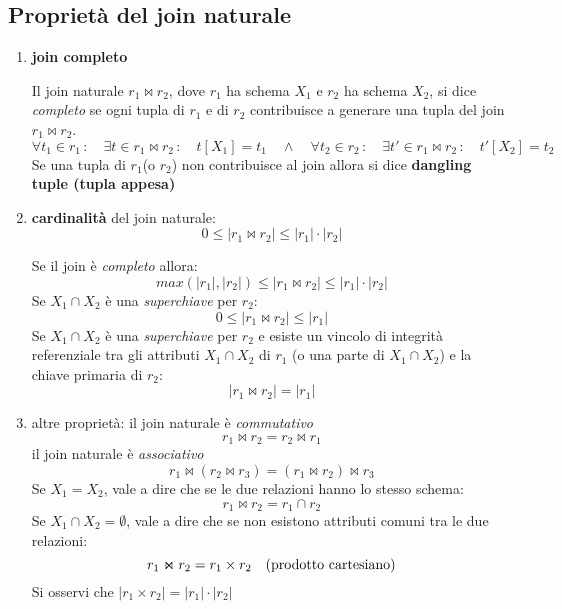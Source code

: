 \documentclass[a4paper, 10pt]{article}
\theoremstyle{definition}
\begin{document}
	\newpage
		
		\subsection*{Proprietà del join naturale}
			\begin{enumerate}
				\item \textbf{join completo}
				
						Il join naturale $r_1 \Join r_2$, dove $r_1$ ha schema $ X_1 $ e $ r_2 $ ha schema 
						$ X_2 $, si dice \emph{completo} se ogni tupla di $ r_1 $ e di $ r_2 $ contribuisce a generare una tupla del join $r_1 \Join r_2$.
							\[
								\forall t_1 \in r_1 \, : \quad \exists t \in r_1 \Join r_2 \, : \quad 
								t[X_1] = t_1 \quad \wedge \quad
								\forall t_2 \in r_2 \, : \quad \exists t' \in  r_1 \Join r_2 \, : \quad t'[X_2] = t_2
							\]
						Se una tupla di $ r_1 $(o $ r_2 $) non contribuisce al join allora si dice 
						\textbf{dangling tuple (tupla appesa)}
				\item \textbf{cardinalità} del join naturale:
						\[
							0 \leq | r_1 \Join r_2 | \leq |r_1|\cdot|r_2|
						\]
						
						Se il join è \emph{completo} allora:
							\[
								max(|r_1|, |r_2|) \leq | r_1 \Join r_2 | \leq |r_1|\cdot|r_2|
							\]
						Se $X_1 \cap X_2$ è una \emph{superchiave} per $r_2$:
							\[
								0 \leq | r_1 \Join r_2 | \leq |r_1|
							\]
						Se $X_1 \cap X_2$ è una \emph{superchiave} per $r_2$ e esiste un vincolo di integrità referenziale tra gli attributi $X_1 \cap X_2$ di $r_1$ (o una parte di 
						$X_1 \cap X_2$) e la chiave primaria di $ r_2 $:
							\[
								| r_1 \Join r_2 | = |r_1|
							\]
				\item altre proprietà:
						\subitem il join naturale è \emph{commutativo}
							\[
								r_1 \Join r_2  = r_2 \Join r_1
							\]
						\subitem il join naturale è \emph{associativo}
							\[
								r_1 \Join (r_2 \Join r_3)  = (r_1 \Join r_2) \Join r_3
							\]
						\subitem Se $ X_1 = X_2 $, vale a dire che se le due relazioni hanno lo stesso schema:
							\[
								r_1 \Join r_2 = r_1 \cap r_2 
							\]
						\subitem Se $ X_1 \cap X_2 = \emptyset $, vale a dire che se non esistono attributi comuni tra le due relazioni:
							\[
								r_1 \Join r_2 = r_1 \times r_2 \quad (\textup{prodotto cartesiano})
							\]
							Si osservi che $ |r_1 \times r_2| = |r_1|\cdot|r_2| $
			\end{enumerate}
			
\end{document}
